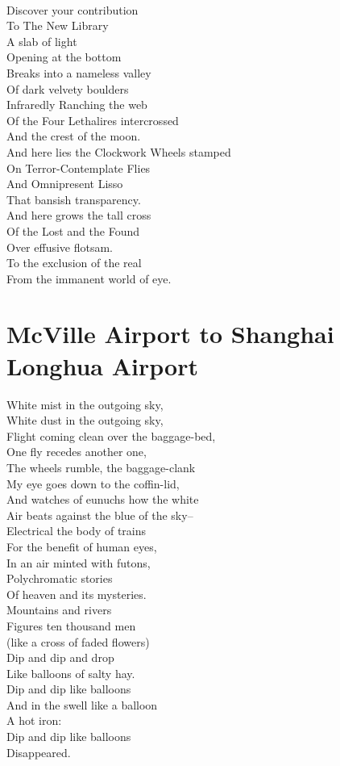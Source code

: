 \documentclass[smalldemyvopaper,11pt,twoside,onecolumn,openright,extrafontsizes]{memoir}
\newlength\drop
\begin{document}
\\Discover your contribution
\\To The New Library
\\A slab of light
\\Opening at the bottom
\\Breaks into a nameless valley
\\Of dark velvety boulders
\\Infraredly Ranching the web
\\Of the Four Lethalires intercrossed
\\And the crest of the moon.
\\And here lies the Clockwork Wheels stamped
\\On Terror-Contemplate Flies
\\And Omnipresent Lisso
\\That bansish transparency.
\\And here grows the tall cross
\\Of the Lost and the Found
\\Over effusive flotsam.
\\To the exclusion of the real
\\From the immanent world of eye.



\chapter{McVille Airport to Shanghai Longhua Airport}
White mist in the outgoing sky,
\\White dust in the outgoing sky,
\\Flight coming clean over the baggage-bed,
\\One fly recedes another one,
\\The wheels rumble, the baggage-clank
\\My eye goes down to the coffin-lid,
\\And watches of eunuchs how the white
\\Air beats against the blue of the sky--
\\Electrical the body of trains
\\For the benefit of human eyes,
\\In an air minted with futons,
\\Polychromatic stories
\\Of heaven and its mysteries.
\\Mountains and rivers
\\Figures ten thousand men
\\(like a cross of faded flowers)
\\Dip and dip and drop
\\Like balloons of salty hay.
\\Dip and dip like balloons
\\And in the swell like a balloon
\\A hot iron:
\\Dip and dip like balloons
\\Disappeared.
\end{document}
